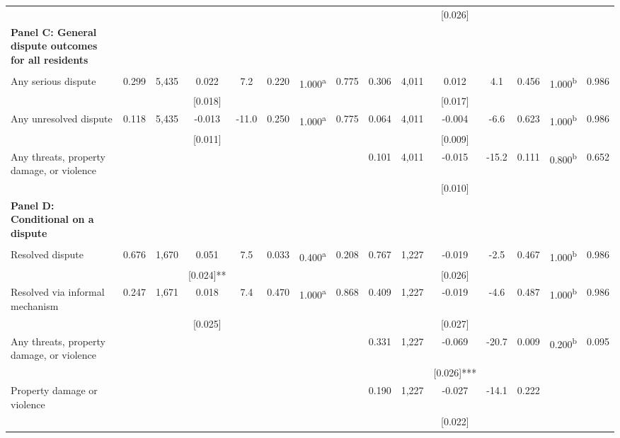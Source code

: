 \begin{tabular}{lcccccccccccccc}
 &  &  &  &  &  &  &  &  &  & [0.026] &  &  &  & \\
\textbf{Panel C: General dispute outcomes for all residents} &  &  &  &  &  &  &  &  &  &  &  &  &  & \\
 &  &  &  &  &  &  &  &  &  &  &  &  &  & \\
Any serious dispute & 0.299 & 5,435 & 0.022 & 7.2 & 0.220 & 1.000\textsuperscript{a} & 0.775 & 0.306 & 4,011 & 0.012 & 4.1 & 0.456 & 1.000\textsuperscript{b} & 0.986\\
 &  &  & [0.018] &  &  &  &  &  &  & [0.017] &  &  &  & \\
Any unresolved dispute & 0.118 & 5,435 & -0.013 & -11.0 & 0.250 & 1.000\textsuperscript{a} & 0.775 & 0.064 & 4,011 & -0.004 & -6.6 & 0.623 & 1.000\textsuperscript{b} & 0.986\\
 &  &  & [0.011] &  &  &  &  &  &  & [0.009] &  &  &  & \\
\phantom{} Any threats, property damage, or violence &  &  &  &  &  &  &  & 0.101 & 4,011 & -0.015 & -15.2 & 0.111 & 0.800\textsuperscript{b} & 0.652\\
 &  &  &  &  &  &  &  &  &  & [0.010] &  &  &  & \\
\textbf{Panel D: Conditional on a dispute} &  &  &  &  &  &  &  &  &  &  &  &  &  & \\
 &  &  &  &  &  &  &  &  &  &  &  &  &  & \\
Resolved dispute & 0.676 & 1,670 & 0.051 & 7.5 & 0.033 & 0.400\textsuperscript{a} & 0.208 & 0.767 & 1,227 & -0.019 & -2.5 & 0.467 & 1.000\textsuperscript{b} & 0.986\\
 &  &  & [0.024]** &  &  &  &  &  &  & [0.026] &  &  &  & \\
\quad Resolved via informal mechanism & 0.247 & 1,671 & 0.018 & 7.4 & 0.470 & 1.000\textsuperscript{a} & 0.868 & 0.409 & 1,227 & -0.019 & -4.6 & 0.487 & 1.000\textsuperscript{b} & 0.986\\
 &  &  & [0.025] &  &  &  &  &  &  & [0.027] &  &  &  & \\
\phantom{} Any threats, property damage, or violence \phantom{} &  &  &  &  &  &  &  & 0.331 & 1,227 & -0.069 & -20.7 & 0.009 & 0.200\textsuperscript{b} & 0.095\\
 &  &  &  &  &  &  &  &  &  & [0.026]*** &  &  &  & \\
\quad Property damage or violence \phantom{} &  &  &  &  &  &  &  & 0.190 & 1,227 & -0.027 & -14.1 & 0.222 &  & \\
 &  &  &  &  &  &  &  &  &  & [0.022] &  &  &  & \\

\end{tabular}
